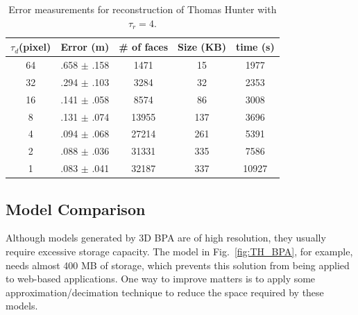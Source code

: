 \documentclass[10pt,journal,cspaper,compsoc]{IEEEtran}
\newcommand{\Fig}[1]{Fig.~\ref{fig:#1}}
\begin{document}
\begin{table}[hbtp]
\begin{center}
\begin{tabular}[t]{||c||c|c|c|c||}
\hline
$\tau_d $(pixel) & Error (m)& \# of faces & Size (KB) & time (s) \\ \hline \hline
64 & .658 $\pm$ .158 & 1471  & 15  & 1977 \\ \hline 
32 & .294 $\pm$ .103 & 3284  & 32  & 2353 \\ \hline
16 & .141 $\pm$ .058 & 8574  & 86  & 3008 \\ \hline
8  & .131 $\pm$ .074 & 13955 & 137 & 3696 \\ \hline
4  & .094 $\pm$ .068 & 27214 & 261 & 5391 \\ \hline
2  & .088 $\pm$ .036 & 31331 & 335 & 7586 \\ \hline
1  & .083 $\pm$ .041 & 32187 & 337 & 10927\\ \hline
\end{tabular}
\end{center}
\caption{Error measurements for reconstruction of Thomas Hunter with $\tau_r = 4$.}
\label{tbl:em}
\end{table}

\subsection{Model Comparison}

Although models generated by 3D BPA are of high resolution, they usually
require excessive storage capacity.
The model in \Fig{TH_BPA}, for example, needs almost 400 MB of storage,
which prevents this solution from being applied to web-based applications.
One way to improve matters is to apply some approximation/decimation
technique to reduce the space required by these models.
\end{document}

